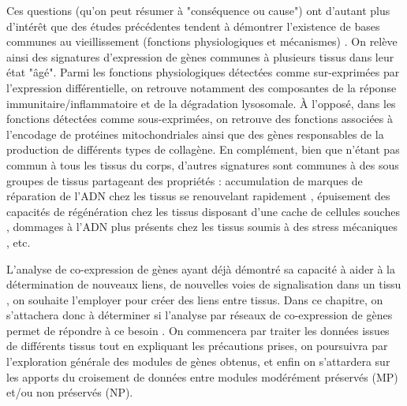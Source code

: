 Ces questions (qu'on peut résumer à "conséquence ou cause") ont d'autant plus d'intérêt que des études précédentes tendent à démontrer l'existence de bases communes au vieillissement (fonctions physiologiques et mécanismes) \cite{DeMagalhaes2009a}. On relève ainsi des signatures d'expression de gènes communes à plusieurs tissus dans leur état "âgé". Parmi les fonctions physiologiques détectées comme sur-exprimées par l'expression différentielle, on retrouve notamment des composantes de la réponse immunitaire/inflammatoire et de la dégradation lysosomale. À l'opposé, dans les fonctions détectées comme sous-exprimées, on retrouve des fonctions associées à l'encodage de protéines mitochondriales ainsi que des gènes responsables de la production de différents types de collagène. En complément, bien que n'étant pas commun à tous les tissus du corps, d'autres signatures sont communes à des sous groupes de tissus partageant des propriétés : accumulation de marques de réparation de l'ADN chez les tissus se renouvelant rapidement \cite{Armanios2012}, épuisement des capacités de régénération chez les tissus disposant d'une cache de cellules souches \cite{Ratajczak2017}, dommages à l'ADN plus présents chez les tissus soumis à des stress mécaniques \cite{Kubben2017}, etc.

L'analyse de co-expression de gènes ayant déjà démontré sa capacité à aider à la détermination de nouveaux liens, de nouvelles voies de signalisation dans un tissu \cite{Hughes2000}, on souhaite l'employer pour créer des liens entre tissus. Dans ce chapitre, on s'attachera donc à déterminer si l'analyse par réseaux de co-expression de gènes permet de répondre à ce besoin . On commencera par traiter les données issues de différents tissus tout en expliquant les précautions prises, on poursuivra par l'exploration générale des modules de gènes obtenus, et enfin on s'attardera sur les apports du croisement de données entre modules modérément préservés (MP) et/ou non préservés (NP). 




